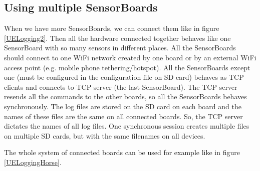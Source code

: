 \subsection{Using multiple SensorBoards}
When we have more SensorBoards, we can connect them like in figure \ref{UELogging2}. Then all the hardware connected together behaves like one SensorBoard with so many sensors in different places. All the SensorBoards should connect to one WiFi network created by one board or by an external WiFi access point (e.g. mobile phone tethering/hotspot). All the SensorBoards except one (must be configured in the configuration file on SD card) behaves as \ac{TCP} clients and connects to \ac{TCP} server (the last SensorBoard). The \ac{TCP} server resends all the commands to the other boards, so all the SensorBoards behaves synchronously. The log files are stored on the SD card on each board and the names of these files are the same on all connected boards. So, the \ac{TCP} server dictates the names of all log files. One synchronous session creates multiple files on multiple SD cards, but with the same filenames on all devices.

The whole system of connected boards can be used for example like in figure \ref{UELoggingHorse}.
